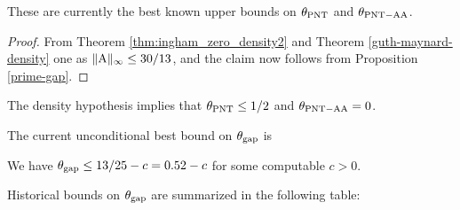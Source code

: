 These are currently the best known upper bounds on $\theta_{\mathrm{PNT}}$ and $\theta_{\mathrm{PNT-AA}}$.

\begin{proof}  From Theorem \ref{thm:ingham_zero_density2} and Theorem \ref{guth-maynard-density} one as $\|\mathrm{A}\|_\infty \leq 30/13$, and the claim now follows from Proposition \ref{prime-gap}.
\end{proof}

\begin{corollary}  The density hypothesis implies that $\theta_{\mathrm{PNT}} \leq 1/2$ and $\theta_{\mathrm{PNT-AA}} = 0$.
\end{corollary}

The current unconditional best bound on $\theta_{\mathrm{gap}}$ is

\begin{theorem}\cite{li_trilinear_2026}\label{bhp-thm} We have $\theta_{\mathrm{gap}} \leq 13/25 - c = 0.52 - c$ for some computable $c > 0$.
\end{theorem}

Historical bounds on $\theta_{\mathrm{gap}}$ are summarized in the following table:

